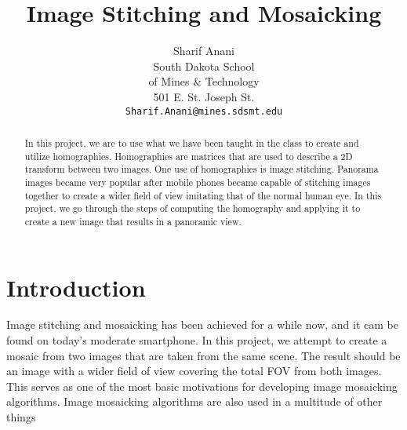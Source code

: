 \documentclass[10pt,twocolumn,letterpaper]{article}
\begin{document}
\title{Image Stitching and Mosaicking}

\author{Sharif Anani\\
South Dakota School\\
of Mines \& Technology\\
501 E. St. Joseph St.\\
{\tt\small Sharif.Anani@mines.sdsmt.edu}
}

\maketitle


\begin{abstract}
   In this project, we are to use what we have been taught in the class to create and utilize homographies. Homographies are matrices that are used to describe a 2D transform between two images. One use of homographies is image stitching. Panorama images became very popular after mobile phones became capable of stitching images together to create a wider field of view imitating that of the normal human eye. In this project, we go through the steps of computing the homography and applying it to create a new image that results in a panoramic view.
\end{abstract}

\section{Introduction}
Image stitching and mosaicking has been achieved for a while now, and it cam be found on today's moderate smartphone. In this project, we attempt to create a mosaic from two images that are taken from the same scene. The result should be an image with a wider field of view covering the total FOV from both images.\\
This serves as one of the most basic motivations for developing image mosaicking algorithms. Image mosaicking algorithms are also used in a multitude of other things 
\end{document}

